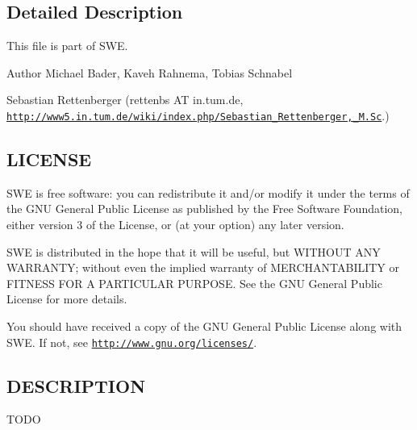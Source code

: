 \subsection{Detailed Description}
This file is part of S\+WE.

\begin{DoxyAuthor}{Author}
Michael Bader, Kaveh Rahnema, Tobias Schnabel 

Sebastian Rettenberger (rettenbs AT in.\+tum.\+de, \href{http://www5.in.tum.de/wiki/index.php/Sebastian_Rettenberger,_M.Sc}{\tt http\+://www5.\+in.\+tum.\+de/wiki/index.\+php/\+Sebastian\+\_\+\+Rettenberger,\+\_\+\+M.\+Sc}.)
\end{DoxyAuthor}
\hypertarget{help_8hh_LICENSE}{}\subsection{L\+I\+C\+E\+N\+SE}\label{help_8hh_LICENSE}
S\+WE is free software\+: you can redistribute it and/or modify it under the terms of the G\+NU General Public License as published by the Free Software Foundation, either version 3 of the License, or (at your option) any later version.

S\+WE is distributed in the hope that it will be useful, but W\+I\+T\+H\+O\+UT A\+NY W\+A\+R\+R\+A\+N\+TY; without even the implied warranty of M\+E\+R\+C\+H\+A\+N\+T\+A\+B\+I\+L\+I\+TY or F\+I\+T\+N\+E\+SS F\+OR A P\+A\+R\+T\+I\+C\+U\+L\+AR P\+U\+R\+P\+O\+SE. See the G\+NU General Public License for more details.

You should have received a copy of the G\+NU General Public License along with S\+WE. If not, see \href{http://www.gnu.org/licenses/}{\tt http\+://www.\+gnu.\+org/licenses/}.\hypertarget{help_8hh_DESCRIPTION}{}\subsection{D\+E\+S\+C\+R\+I\+P\+T\+I\+ON}\label{help_8hh_DESCRIPTION}
T\+O\+DO 